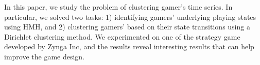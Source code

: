 In this paper, we study the problem of clustering
gamer's time series.  In particular, we solved two tasks: 
1) identifying gamers' underlying playing states using HMH, 
and 2) clustering gamers' based on their state transitions using
a Dirichlet clustering method. 
We experimented on one of the strategy game developed by Zynga Inc,
and the results reveal interesting results that can help improve the game design.



